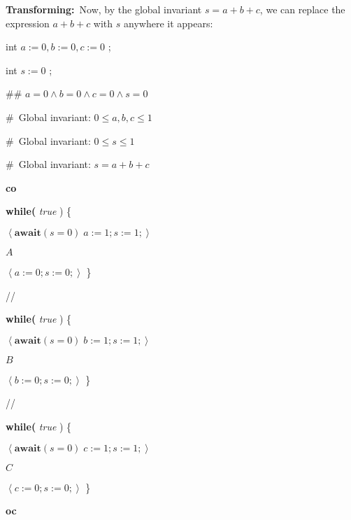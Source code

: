 \documentclass[11pt]{article}%
\begin{document}
\textbf{Transforming:}\ Now, by the global invariant $s=a+b+c$, we can replace
the expression $a+b+c$ with $s$ anywhere it appears:

\begin{code}
int $a:=0,b:=0,c:=0$ ;

int $s:=0$ ;

\#\# $a=0\wedge b=0\wedge c=0\wedge s=0$

\#\ Global invariant: $0\leq a,b,c\leq1$

\#\ Global invariant: $0\leq s\leq1$

\#\ Global invariant: $s=a+b+c$

\textbf{co}

\begin{indent}
\item \textbf{while(} \textit{true} ) \{

\begin{indent}
\item $\left\langle \mathbf{await}(s=0)\;a:=1;s:=1;\right\rangle $

\item $A$

\item $\left\langle a:=0;s:=0;\right\rangle $ \}
\end{indent}
\end{indent}

//

\begin{indent}
\item \textbf{while(} \textit{true} ) \{

\begin{indent}
\item $\left\langle \mathbf{await}(s=0)\;b:=1;s:=1;\right\rangle $

\item $B$

\item $\left\langle b:=0;s:=0;\right\rangle $ \}
\end{indent}
\end{indent}

//

\begin{indent}
\item \textbf{while(} \textit{true} ) \{

\begin{indent}
\item $\left\langle \mathbf{await}(s=0)\;c:=1;s:=1;\right\rangle $

\item $C$

\item $\left\langle c:=0;s:=0;\right\rangle $ \}
\end{indent}
\end{indent}

\textbf{oc}
\end{code}
\end{document}

